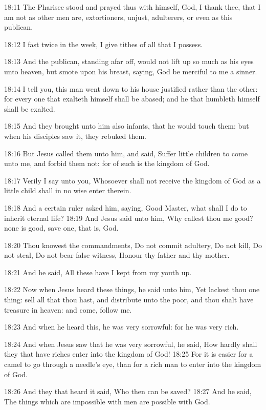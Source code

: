 18:11 The Pharisee stood and prayed thus with himself, God, I thank
thee, that I am not as other men are, extortioners, unjust,
adulterers, or even as this publican.

18:12 I fast twice in the week, I give tithes of all that I possess.

18:13 And the publican, standing afar off, would not lift up so much
as his eyes unto heaven, but smote upon his breast, saying, God be
merciful to me a sinner.

18:14 I tell you, this man went down to his house justified rather
than the other: for every one that exalteth himself shall be abased;
and he that humbleth himself shall be exalted.

18:15 And they brought unto him also infants, that he would touch
them: but when his disciples saw it, they rebuked them.

18:16 But Jesus called them unto him, and said, Suffer little children
to come unto me, and forbid them not: for of such is the kingdom of
God.

18:17 Verily I say unto you, Whosoever shall not receive the kingdom
of God as a little child shall in no wise enter therein.

18:18 And a certain ruler asked him, saying, Good Master, what shall I
do to inherit eternal life?  18:19 And Jesus said unto him, Why
callest thou me good? none is good, save one, that is, God.

18:20 Thou knowest the commandments, Do not commit adultery, Do not
kill, Do not steal, Do not bear false witness, Honour thy father and
thy mother.

18:21 And he said, All these have I kept from my youth up.

18:22 Now when Jesus heard these things, he said unto him, Yet lackest
thou one thing: sell all that thou hast, and distribute unto the poor,
and thou shalt have treasure in heaven: and come, follow me.

18:23 And when he heard this, he was very sorrowful: for he was very
rich.

18:24 And when Jesus saw that he was very sorrowful, he said, How
hardly shall they that have riches enter into the kingdom of God!
18:25 For it is easier for a camel to go through a needle's eye, than
for a rich man to enter into the kingdom of God.

18:26 And they that heard it said, Who then can be saved?  18:27 And
he said, The things which are impossible with men are possible with
God.

